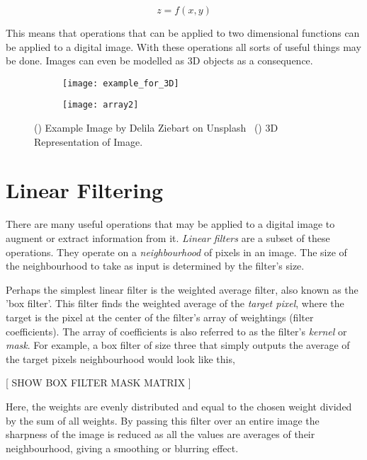 \begin{equation}
    z = f(x,y)
    \label{eq:2Dfunc}
\end{equation}

This means that operations that can be applied to two dimensional functions can be applied to a digital image. With these operations all sorts of useful things may be done. Images can even be modelled as 3D objects as a consequence.

\begin{figure}[ht!]
  \centering
  \begin{subfigure}[b]{0.5\linewidth}
    \centering\texttt{[image: example\_for\_3D]}
    \caption{\label{fig:fig1}}
  \end{subfigure}%
  \begin{subfigure}[b]{0.5\linewidth}
    \centering\texttt{[image: array2]}
    \caption{\label{fig:fig2}}
  \end{subfigure}
  \caption{() Example Image by Delila Ziebart on Unsplash ~() 3D Representation of Image.}
  \label{fig:2Darray}

\end{figure}




\section{Linear Filtering}

There are many useful operations that may be applied to a digital image to augment or extract information from it. \emph{Linear filters} are a subset of these operations. They operate on a \emph{neighbourhood} of pixels in an image. The size of the neighbourhood to take as input is determined by the filter's size. 

Perhaps the simplest linear filter is the weighted average filter, also known as the 'box filter'. This filter finds the weighted average of the \emph{target pixel}, where the target is the pixel at the center of the filter's array of weightings (filter coefficients). The array of coefficients is also referred to as the filter's \emph{kernel} or \emph{mask}. For example, a box filter of size three that simply outputs the average of the target pixels neighbourhood would look like this,

[ SHOW BOX FILTER MASK MATRIX ]

Here, the weights are evenly distributed and equal to the chosen weight divided by the sum of all weights. By passing this filter over an entire image the sharpness of the image is reduced as all the values are averages of their neighbourhood, giving a smoothing or blurring effect.

